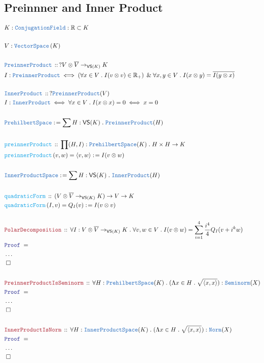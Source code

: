 \documentclass[12pt]{scrartcl}
\newcommand{\TYPE}[1]{\textcolor{NavyBlue}{\mathtt{#1}}}
\newcommand{\FUNC}[1]{\textcolor{Cerulean}{\mathtt{#1}}}
\newcommand{\LOGIC}[1]{\textcolor{Blue}{\mathtt{#1}}}
\newcommand{\THM}[1]{\textcolor{Maroon}{\mathtt{#1}}}
\renewcommand{\.}{\; . \;}
\newcommand{\de}{: \kern 0.1pc =}
\newcommand{\Act}[1]{\left( #1 \right)}
\newcommand{\Theorem}[2]{& \THM{#1} \, :: \, #2 \\ & \Proof = \\ }
\newcommand{\DeclareType}[2]{& \TYPE{#1} \, :: \, #2 \\}
\newcommand{\DefineType}[3]{& #1 : \TYPE{#2} \iff #3 \\}
\newcommand{\DeclareFunc}[2]{& \FUNC{#1} \, :: \, #2 \\}
\newcommand{\DefineNamedFunc}[4]{&  \FUNC{#1}\Act{#2} = #3 \de #4 \\}
\newcommand{\Page}[1]{\begin{align*} #1 \end{align*} \newpage   }
\newcommand{\NoProof}{ & \ldots \\ \EndProof}
\renewcommand{\And}{\; \& \;}
\newcommand{\Reals}{\mathbb{R} }
\newcommand{\QED}{\; \square}
\newcommand{\EndProof}{& \QED \\}
\newcommand{\Proof}{\LOGIC{Proof} \; }
\newcommand{\VS}[1]{\TYPE{VectorSpace}\left( #1 \right)}
\begin{document}
\subsection{Preinnner and Inner Product}
\Page{
 & K : \TYPE{ConjugationField} : \Reals \subset K  \\
 \\
 &  V : \VS{K} \\
  \\
 \DeclareType{PreinnerProduct}{?V \otimes \overline{V} \to_{\mathsf{VS}(K)} K }
 \DefineType{ I  }{PreinnerProduct}{ \left(\forall x \in V \. I(v \otimes v) \in \Reals_+ 
  \right) \And \forall x,y \in V \. I(x \otimes y) = \overline{I(y \otimes x)}} 
  \\
  \DeclareType{InnerProduct}{? \TYPE{PreinnerProduct}(V)}
  \DefineType{I}{InnerProduct}{ \forall x \in V \. I(x \otimes x) = 0 \iff x = 0 }
  \\
  & \TYPE{PrehilbertSpace} \de \sum H  : \mathsf{VS}(K) \. \TYPE{PreinnerProduct}(H) 
  \\ \\
  \DeclareFunc{ preinnerProduct }{ \prod  (H,I) :\TYPE{PrehilbertSpace}(K) \. H \times H \to K }
  \DefineNamedFunc{ preinnerProduct }{ v,w  }{ \langle v, w \rangle }{ I(v \otimes w)}
  \\
  & \TYPE{InnerProductSpace} \de \sum H : \mathsf{VS}(K) \. \TYPE{InnerProduct}(H) \\
  \\
  \DeclareFunc{quadraticForm}{ (V \otimes \overline{ V} \to_{\mathsf{VS}(K)} K) \to V \to K }
  \DefineNamedFunc{quadraticForm}{I,v}{Q_I(v)}{ I(v \otimes v)}
  \\
  \Theorem{PolarDecomposition}{ \forall I : V \otimes \overline V \to_{\mathsf{VS}(K)}  K 
   \. \forall v,w \in V \. I(v \otimes w) = \sum^4_{i = 1} \frac{i^4}{4}Q_I(v + i^k w) }
  \NoProof
  \\
  \Theorem{PreinnerProductIsSeminorm}{ \forall H : \TYPE{PrehilbertSpace}(K)
  \.  ( \Lambda x \in H \. \sqrt{ \langle x, x \rangle } ) : \TYPE{Seminorm}(X)}
  \NoProof   
  \\
  \Theorem{InnerProductIsNorm}{ \forall H : \TYPE{InnerProductSpace}(K)
  \.  ( \Lambda x \in H \. \sqrt{ \langle x, x \rangle } ) : \TYPE{Norm}(X)}
  \NoProof   
}
\end{document}
